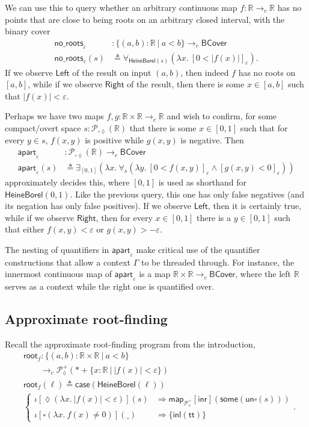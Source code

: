 \documentclass[conference]{IEEEtran}
\newcommand{\PLower}{\mathcal{P}_\lozenge}
\newcommand{\Viet}{\mathcal{P}_{\square\lozenge}}
\newcommand{\cto}{\to_c}
\newcommand{\R}{\mathbb{R}}
\newcommand{\map}[2]{\mathsf{map}_{#1}[{#2}]}
\newcommand{\fun}[2]{\lambda {#1}.\  {#2}}
\newcommand{\suchthat}{\ |\ }
\newcommand{\One}{\ast}
\newcommand{\wildcard}{\_}
\newcommand{\oinclf}[1]{\iota[{#1}]}
\newcommand{\oincl}[2]{\oinclf{#1} \left({#2}\right)}
\newcommand{\Branch}{\Rightarrow}
\newcommand{\BCover}{\mathsf{BCover}}
\newcommand{\RootFindingCode}{
&\mathsf{root}_f : \{ (a, b) : \R \times \R \suchthat a < b \}
  \\ &\qquad \cto \PLower^+(\One + \{ x : \R \suchthat |f(x)| < \varepsilon \})
\\ &\mathsf{root}_f(\ell) \triangleq \mathsf{case}(\mathsf{HeineBorel}(\ell))
\\ &\begin{cases}
\oincl{\lozenge (\fun{x}{|f(x)| < \varepsilon})}{s} 
  &\Branch \map{\PLower^+}{\mathsf{inr}}(\mathsf{some}(\mathsf{un}\square(s)))
\\ \oincl{\square (\fun{x}{f(x) \neq 0})}{\wildcard}
  &\Branch \{ \mathsf{inl}(\mathsf{tt}) \}
\end{cases}
}
\newcommand{\grammar}[1]{\textcolor{red}{\underline{#1}}}
\renewcommand{\grammar}[1]{#1}
\begin{document}
We can use \grammar{this} to query whether an arbitrary continuous map $f : \R \cto \R$ has no points that are close to being roots on an arbitrary closed interval, with the binary cover
\begin{align*}
\mathsf{no\_roots}_{\varepsilon} &: \{ (a, b) : \R \suchthat a < b\} \cto \BCover
\\ \mathsf{no\_roots}_\varepsilon(s) &\triangleq
  \forall_{\mathsf{HeineBorel}(s)}(\fun{x}{[ 0 < |f(x)| ]_\varepsilon}).
\end{align*}
If we observe $\mathsf{Left}$ of the result on input $(a, b)$, then indeed $f$ has no roots on $[a, b]$, while if we observe $\mathsf{Right}$ of the result, then there is some $x \in [a, b]$ such that $|f(x)| < \varepsilon$.

Perhaps we have two maps $f, g : \R \times \R \cto \R$ and wish to confirm, for some compact/overt space $s : \Viet(\R)$ that there is some $x \in [0,1]$ such that for every $y \in s$, $f(x, y)$ is positive while $g(x,y)$ is negative. Then
\begin{align*}
\mathsf{apart}_{\varepsilon} &: \Viet(\R) \cto \BCover
\\ \mathsf{apart}_\varepsilon(s) &\triangleq
  \exists_{[0,1]}(\fun{x}{\forall_{s}(\fun{y}{[ 0 < f(x, y) ]_\varepsilon \wedge [g(x, y) < 0]_\varepsilon})})
\end{align*}
approximately decides \grammar{this}, where $[0,1]$ is used as shorthand for $\mathsf{HeineBorel}(0,1)$.
Like the previous query, this one has only false negatives (and its negation has only false positives). If we observe $\mathsf{Left}$, then it is certainly true, while if we observe $\mathsf{Right}$, then for every $x \in [0,1]$ there is a $y \in [0,1]$ such that either $f(x, y) < \varepsilon$ or $g(x, y) > -\varepsilon$.

The nesting of quantifiers in $\mathsf{apart}_\varepsilon$ make critical use of the quantifier constructions that allow a context $\Gamma$ to be threaded through. For instance, the innermost continuous map of $\mathsf{apart}_\varepsilon$ is a map $\R \times \R \cto \BCover$, where the left $\R$ serves as a context while the right one is quantified over.

\subsection{Approximate root-finding}
\label{s:bcov:root}

Recall the approximate root-finding program from the introduction,
\begin{align*}
\RootFindingCode.
\end{align*}
\end{document}
